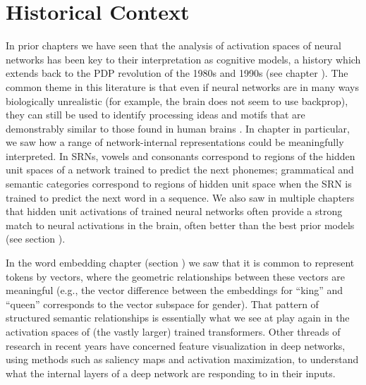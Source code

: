 
\section{Historical Context}\label{mechInterpHist}

In prior chapters we have seen that the analysis of activation spaces of neural
networks has been key to their interpretation as cognitive models, a history
which extends back to the PDP revolution of the 1980s and 1990s (see chapter
). The common theme in this literature is that even if
neural networks are in many ways biologically unrealistic (for example, the
brain does not seem to use backprop), they can still be used to identify
processing ideas and motifs that are demonstrably similar to those found in
human brains \cite{zipser1992identification}. In chapter
 in particular, we saw how a range of
network-internal representations could be meaningfully interpreted. In SRNs,
vowels and consonants correspond to regions of the hidden unit spaces of a
network trained to predict the next phonemes; grammatical and semantic
categories correspond to regions of hidden unit space when the SRN is trained
to predict the next word in a sequence. We also saw in multiple chapters that
hidden unit activations of trained neural networks often provide a strong match
to neural activations in the brain, often better than the best prior models
(see section ).

In the word embedding chapter (section ) we saw
that it is common to represent tokens by vectors, where the geometric
relationships between these vectors are meaningful (e.g., the vector difference
between the embeddings for ``king'' and ``queen'' corresponds to the vector
subspace for gender). That pattern of structured semantic relationships is
essentially what we see at play again in the activation spaces of (the vastly
larger) trained transformers. Other threads of research in recent years have
concerned feature visualization in deep networks, using methods such as
saliency maps and activation maximization, to understand what the internal
layers of a deep network are responding to in their inputs.

